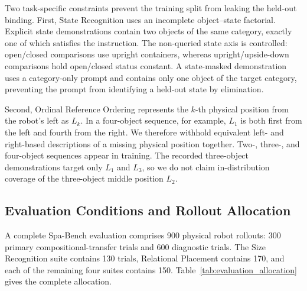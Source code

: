 Two task-specific constraints prevent the training split from leaking the held-out binding. First, State Recognition uses an incomplete object--state factorial. Explicit state demonstrations contain two objects of the same category, exactly one of which satisfies the instruction. The non-queried state axis is controlled: open/closed comparisons use upright containers, whereas upright/upside-down comparisons hold open/closed status constant. A state-masked demonstration uses a category-only prompt and contains only one object of the target category, preventing the prompt from identifying a held-out state by elimination.

Second, Ordinal Reference Ordering represents the $k$-th physical position from the robot's left as $L_k$. In a four-object sequence, for example, $L_1$ is both first from the left and fourth from the right. We therefore withhold equivalent left- and right-based descriptions of a missing physical position together. Two-, three-, and four-object sequences appear in training. The recorded three-object demonstrations target only $L_1$ and $L_3$, so we do not claim in-distribution coverage of the three-object middle position $L_2$.

\subsection{Evaluation Conditions and Rollout Allocation}

A complete Spa-Bench evaluation comprises 900 physical robot rollouts: 300 primary compositional-transfer trials and 600 diagnostic trials. The Size Recognition suite contains 130 trials, Relational Placement contains 170, and each of the remaining four suites contains 150. Table~\ref{tab:evaluation_allocation} gives the complete allocation.


